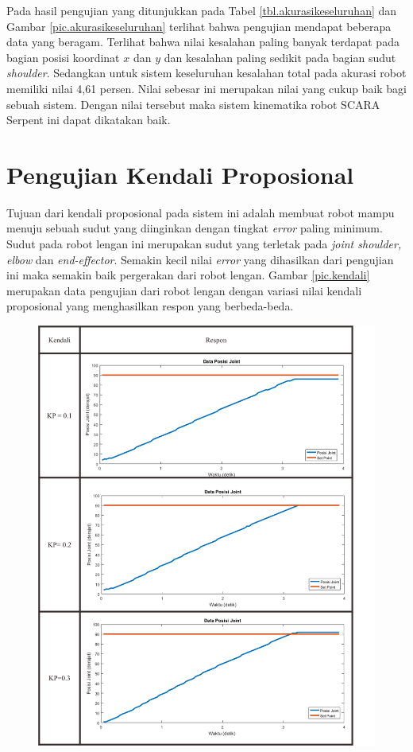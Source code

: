 Pada hasil pengujian yang ditunjukkan pada Tabel \ref{tbl.akurasikeseluruhan} dan Gambar \ref{pic.akurasikeseluruhan} terlihat bahwa pengujian mendapat beberapa data yang beragam. Terlihat bahwa nilai kesalahan paling banyak terdapat pada bagian posisi koordinat $x$ dan $y$ dan kesalahan paling sedikit pada bagian sudut \textit{shoulder}. Sedangkan untuk sistem keseluruhan kesalahan total pada akurasi robot memiliki nilai 4,61 persen. Nilai sebesar ini merupakan nilai yang cukup baik bagi sebuah sistem. Dengan nilai tersebut maka sistem kinematika robot SCARA Serpent ini dapat dikatakan baik. 


\section{Pengujian Kendali Proposional}
Tujuan dari kendali proposional pada sistem ini adalah membuat robot mampu menuju sebuah sudut yang diinginkan dengan tingkat \textit{error} paling minimum. Sudut pada robot lengan ini merupakan sudut yang terletak pada \textit{joint shoulder, elbow} dan \textit{end-effector}. Semakin kecil nilai \textit{error} yang dihasilkan dari pengujian ini maka semakin baik pergerakan dari robot lengan. Gambar \ref{pic.kendali} merupakan data pengujian dari robot lengan dengan variasi nilai kendali proposional yang menghasilkan respon yang berbeda-beda.


\begin{figure}[H]
	\centering
	\includegraphics[width=13cm]{gambar/kendali1.png}
\end{figure}


